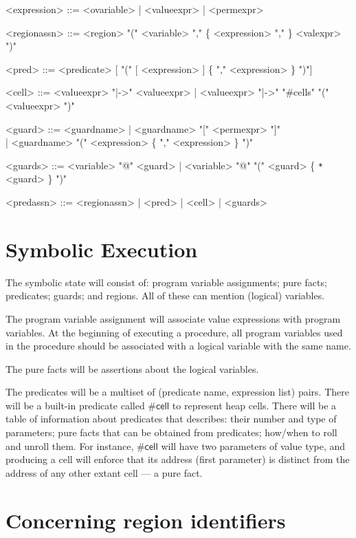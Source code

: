 \documentclass[a4paper]{article}
\begin{document}
\begin{grammar}
  <expression> ::= <ovariable> | <valueexpr> | <permexpr>

  <regionassn> ::= <region> "(" <variable> "," \{ <expression> "," \} <valexpr> ")"

  <pred> ::= <predicate> [ "(" [ <expression> ] \{ "," <expression> \} ")"]

  <cell> ::= <valueexpr> "|->" <valueexpr> | <valueexpr> "|->" "#cells" "(" <valueexpr> ")"

  <guard> ::= <guardname> | <guardname> "[" <permexpr> "]" \\
  | {\color{blue} <guardname> "(" <expression> \{ "," <expression> \} ")" }

  <guards> ::= <variable> "@" <guard> | <variable> "@" "(" <guard> \{ \verb|*| <guard> \} ")"

  <predassn> ::= <regionassn> | <pred> | <cell> | <guards>

\end{grammar}

\section{Symbolic Execution}

The symbolic state will consist of: program variable assignments; pure facts; predicates; guards; and regions.
All of these can mention (logical) variables.

The program variable assignment will associate value expressions with program variables.
At the beginning of executing a procedure, all program variables used in the procedure should be associated with a logical variable with the same name.

The pure facts will be assertions about the logical variables.

The predicates will be a multiset of (predicate name, expression list) pairs.
There will be a built-in predicate called $\mathsf{\#cell}$ to represent heap cells.
There will be a table of information about predicates that describes: their number and type of parameters; pure facts that can be obtained from predicates; how/when to roll and unroll them.
For instance, $\mathsf{\#cell}$ will have two parameters of value type, and producing a cell will enforce that its address (first parameter) is distinct from the address of any other extant cell --- a pure fact.


\section{Concerning region identifiers}
\end{document}
